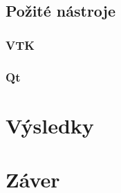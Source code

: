 \documentclass[a4paper,11pt,twoside]{article}%
\begin{document}
\subsection{Požité nástroje}

\subsubsection{VTK}

\subsubsection{Qt}




\newpage
\section{Výsledky}

\newpage
\section{Záver}

\newpage
\begin{thebibliography}{50}
\end{thebibliography}
\end{document}
